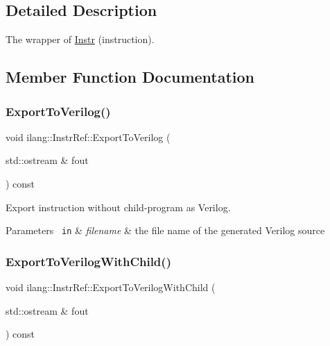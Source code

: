 \subsection{Detailed Description}
The wrapper of \mbox{\hyperlink{classilang_1_1_instr}{Instr}} (instruction). 

\subsection{Member Function Documentation}
\mbox{\label{classilang_1_1_instr_ref_aeba473876c6b0ede7a5419ccf041f7a4}} 
\subsubsection{\texorpdfstring{Export\+To\+Verilog()}{ExportToVerilog()}}
{\footnotesize\ttfamily void ilang\+::\+Instr\+Ref\+::\+Export\+To\+Verilog (\begin{DoxyParamCaption}\item[{std\+::ostream \&}]{fout }\end{DoxyParamCaption}) const}



Export instruction without child-\/program as Verilog. 


\begin{DoxyParams}[1]{Parameters}
\mbox{\texttt{ in}}  & {\em filename} & the file name of the generated Verilog source \\
\hline
\end{DoxyParams}
\mbox{\label{classilang_1_1_instr_ref_a18358b75b64144e875a5afca306d3fa7}} 
\subsubsection{\texorpdfstring{Export\+To\+Verilog\+With\+Child()}{ExportToVerilogWithChild()}}
{\footnotesize\ttfamily void ilang\+::\+Instr\+Ref\+::\+Export\+To\+Verilog\+With\+Child (\begin{DoxyParamCaption}\item[{std\+::ostream \&}]{fout }\end{DoxyParamCaption}) const}



